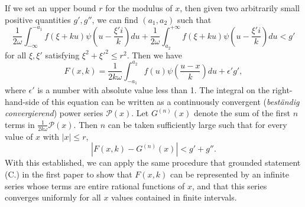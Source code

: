 \documentclass{article}
\begin{document}
If we set an upper bound $r$ for the modulus of $x$, then given two arbitrarily small positive quantities $g', g''$, we can find $(a_1,a_2)$ such that
\begin{equation*}
\frac{1}{2\omega}\int_{-\infty}^{-a_1}f(\xi+ku)\psi\left(u-\frac{\xi'i}{k}\right)du + \frac{1}{2\omega}\int_{a_2}^{+\infty}f(\xi+ku)\psi\left(u-\frac{\xi'i}{k}\right)du<g'
\end{equation*}
for all $\xi,\xi'$ satisfying $\xi^2+\xi'^2\leq r^2$. Then we have
\begin{equation*}
F(x,k)=\frac{1}{2k\omega}\int_{-a_1}^{a_2}f(u)\psi\left(\frac{u-x}{k}\right)du+\epsilon'g',
\end{equation*}
where $\epsilon'$ is a number with absolute value less than 1. The integral on the right-hand-side of this equation can be written as a continuously convergent (\textit{best\"{a}ndig convergierend}) power series $\mathcal{P}(x)$. Let $G^{(n)}(x)$ denote the sum of the first $n$ terms in $\frac{1}{2k\omega}\mathcal{P}(x)$. Then $n$ can be taken sufficiently large such that for every value of $x$ with $|x|\leq r$,
\begin{equation*}
    |F(x,k)-G^{(n)}(x)|<g'+g''.
\end{equation*}
With this established, we can apply the same procedure that grounded statement (C.) in the first paper to show that $F(x,k)$ can be represented by an infinite series whose terms are entire rational functions of $x$, and that this series converges uniformly for all $x$ values contained in finite intervals. 
\end{document}

